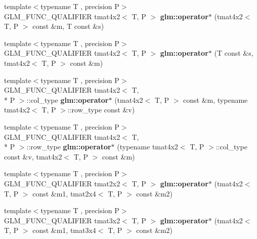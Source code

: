 \begin{DoxyCompactItemize}
\item 
\hypertarget{namespaceglm_a31ed3a224addbf020096fbc2f77183ae}{{\footnotesize template$<$typename T , precision P$>$ }\\G\-L\-M\-\_\-\-F\-U\-N\-C\-\_\-\-Q\-U\-A\-L\-I\-F\-I\-E\-R tmat4x2$<$ T, P $>$ {\bfseries glm\-::operator$\ast$} (tmat4x2$<$ T, P $>$ const \&m, T const \&s)}\label{namespaceglm_a31ed3a224addbf020096fbc2f77183ae}

\item 
\hypertarget{namespaceglm_a99d479929603d6aaab1fb64392f17e7b}{{\footnotesize template$<$typename T , precision P$>$ }\\G\-L\-M\-\_\-\-F\-U\-N\-C\-\_\-\-Q\-U\-A\-L\-I\-F\-I\-E\-R tmat4x2$<$ T, P $>$ {\bfseries glm\-::operator$\ast$} (T const \&s, tmat4x2$<$ T, P $>$ const \&m)}\label{namespaceglm_a99d479929603d6aaab1fb64392f17e7b}

\item 
\hypertarget{namespaceglm_a3c8f8da268292ca55b88850c5ade90e8}{{\footnotesize template$<$typename T , precision P$>$ }\\G\-L\-M\-\_\-\-F\-U\-N\-C\-\_\-\-Q\-U\-A\-L\-I\-F\-I\-E\-R tmat4x2$<$ T, \\*
P $>$\-::col\-\_\-type {\bfseries glm\-::operator$\ast$} (tmat4x2$<$ T, P $>$ const \&m, typename tmat4x2$<$ T, P $>$\-::row\-\_\-type const \&v)}\label{namespaceglm_a3c8f8da268292ca55b88850c5ade90e8}

\item 
\hypertarget{namespaceglm_a0137c6449a730160b2b3905ddddcd382}{{\footnotesize template$<$typename T , precision P$>$ }\\G\-L\-M\-\_\-\-F\-U\-N\-C\-\_\-\-Q\-U\-A\-L\-I\-F\-I\-E\-R tmat4x2$<$ T, \\*
P $>$\-::row\-\_\-type {\bfseries glm\-::operator$\ast$} (typename tmat4x2$<$ T, P $>$\-::col\-\_\-type const \&v, tmat4x2$<$ T, P $>$ const \&m)}\label{namespaceglm_a0137c6449a730160b2b3905ddddcd382}

\item 
\hypertarget{namespaceglm_ae6809ec794b89dfe2748f928eee93d9e}{{\footnotesize template$<$typename T , precision P$>$ }\\G\-L\-M\-\_\-\-F\-U\-N\-C\-\_\-\-Q\-U\-A\-L\-I\-F\-I\-E\-R tmat2x2$<$ T, P $>$ {\bfseries glm\-::operator$\ast$} (tmat4x2$<$ T, P $>$ const \&m1, tmat2x4$<$ T, P $>$ const \&m2)}\label{namespaceglm_ae6809ec794b89dfe2748f928eee93d9e}

\item 
\hypertarget{namespaceglm_a10dbd564c2e09836e8e6b92b755071c4}{{\footnotesize template$<$typename T , precision P$>$ }\\G\-L\-M\-\_\-\-F\-U\-N\-C\-\_\-\-Q\-U\-A\-L\-I\-F\-I\-E\-R tmat3x2$<$ T, P $>$ {\bfseries glm\-::operator$\ast$} (tmat4x2$<$ T, P $>$ const \&m1, tmat3x4$<$ T, P $>$ const \&m2)}\label{namespaceglm_a10dbd564c2e09836e8e6b92b755071c4}


\end{DoxyCompactItemize}
